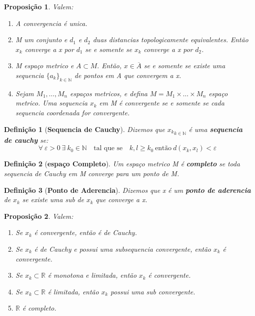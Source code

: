 \documentclass{article}
\newtheorem*{definition}{Definição}
\newtheorem*{proposicao}{Proposição}
\begin{document}
\begin{proposicao}
    Valem: 
    \begin{enumerate}
        \item A convergencia é unica.
        \item M um conjunto e $d_1$ e $d_2$ duas distancias topologicamente equivalentes. Então $x_k$ converge a x por $d_1$
            se e somente se $x_k$ converge a x por $d_2$.
        \item M espaço metrico e $A \subset M$. Então, $x \in \overline{A}$ se e somente se existe uma sequencia $\{a_k\}_{k \in \mathbb{N}}$
            de pontos em A que convergem a x.
        \item Sejam $M_1, \dots, M_n$ espaços metricos, e defina $M = M_1 \times \dots \times M_n$ espaço metrico.
            Uma sequencia $x_k$ em M é convergente se e somente se cada sequencia coordenada for convergente.
    \end{enumerate}
\end{proposicao}

\begin{definition}[\textbf{Sequencia de Cauchy}]
    Dizemos que ${x_k}_{k \in \mathbb{N}}$ é uma \textbf{sequencia de cauchy} se:
     \[\forall \: \varepsilon > 0 \: \exists \: k_0 \in \mathbb{N} \quad \text{tal que se} \quad k, l \geq k_0 \: \text{então} \: d(x_k, x_l) < \varepsilon\]
\end{definition}

\begin{definition}[\textbf{espaço Completo}]
    Um espaço metrico M é \textbf{completo} se toda sequencia de Cauchy em M converge para um ponto de M.
\end{definition}

\begin{definition}[\textbf{Ponto de Aderencia}]
    Dizemos que x é um \textbf{ponto de aderencia} de $x_k$ se existe uma sub de $x_k$ que converge a x.
\end{definition}

\begin{proposicao}
    Valem:
    \begin{enumerate}
        \item Se $x_k$ é convergente, então é de Cauchy.
        \item Se $x_k$ é de Cauchy e possui uma subsequencia convergente, então $x_k$ é convergente.
        \item Se $x_k \subset \mathbb{R}$ é monotona e limitada, então $x_k$ é convergente.
        \item Se $x_k \subset \mathbb{R}$ é limitada, então $x_k$ possui uma sub convergente.
        \item $\mathbb{R}$ é completo.
    \end{enumerate}
\end{proposicao}
\end{document}
